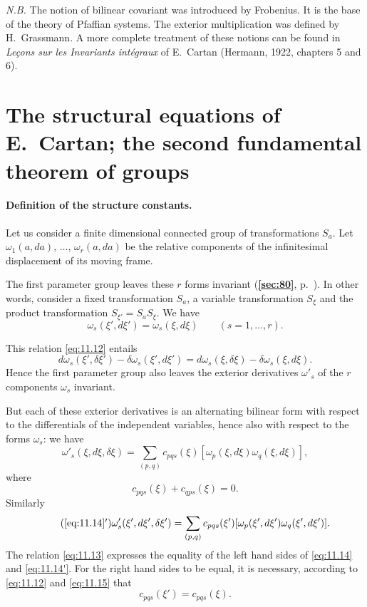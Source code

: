 \documentclass[leqno,11pt]{book}
\numberwithin{equation}{chapter}
\theoremstyle{shape1}
\theoremstyle{shapesmall}
\newcommand{\fsref}[1]{{\rm\textsection\textbf{\ref{sec:#1}}}}
\begin{document}
\emph{N.B.} The notion of bilinear covariant was introduced by Frobenius. It is the base of the theory of Pfaffian systems. The exterior multiplication was defined by H.~Grassmann. A more complete treatment of these notions can be found in \emph{Leçons sur les Invariants intégraux} of E.~Cartan (Hermann, 1922, chapters 5 and 6).


\section{The structural equations of E.~Cartan; the second fundamental theorem of groups}
\label{sec:struct-equat-e}

\paragraph{Definition of the structure constants.}
\label{sec:157}
Let us consider a finite dimensional connected group of transformations $S_{a}$. Let $\omega_{1}(a,da)$, $\dots$, $\omega_{r}(a,da)$ be the relative components of the infinitesimal displacement of its moving frame.

The first parameter group leaves these $r$ forms invariant (\fsref{80}, p.~\pageref{sec:80}). In other words, consider a fixed transformation $S_{a}$, a variable transformation $S_{\xi}$ and the product transformation $S_{\xi'}=S_{a}S_{\xi}$. We have
\begin{equation}
  \label{eq:11.12}
  \omega_{s}(\xi',d\xi')=\omega_{s}(\xi,d\xi)\qquad(s=1,\dots,r).
\end{equation}

This relation \eqref{eq:11.12} entails
\begin{equation}
  \label{eq:11.13}
  d\omega_{s}(\xi',\delta\xi')-\delta\omega_{s}(\xi',d\xi')=d\omega_{s}(\xi,\delta\xi)-\delta\omega_{s}(\xi,d\xi).
\end{equation}
Hence the first parameter group also leaves the exterior derivatives $\omega'_{s}$ of the $r$ components $\omega_{s}$ invariant.

But each of these exterior derivatives is an alternating bilinear form with respect to the differentials of the independent variables, hence also with respect to the forms $\omega_{s}$: we have
\begin{equation}
  \label{eq:11.14}
  \omega'_{s}(\xi,d\xi,\delta\xi)=\sum_{(p,q)}c_{pqs}(\xi)[\omega_{p}(\xi,d\xi)\omega_{q}(\xi,d\xi)],
\end{equation}
where
\begin{equation}
  \label{eq:11.15}
  c_{pqs}(\xi)+c_{qps}(\xi)=0.
\end{equation}
Similarly
\begin{equation}
  \label{eq:11.14'}\tag{\ref{eq:11.14}$'$}
  \omega'_{s}(\xi',d\xi',\delta\xi')=\sum_{(p,q)}c_{pqs}(\xi')[\omega_{p}(\xi',d\xi')\omega_{q}(\xi',d\xi')].
\end{equation}
The relation \eqref{eq:11.13} expresses the equality of the left hand sides of \eqref{eq:11.14} and \eqref{eq:11.14'}. For the right hand sides to be equal, it is necessary, according to \eqref{eq:11.12} and \eqref{eq:11.15} that
\[
c_{pqs}(\xi')=c_{pqs}(\xi).
\]
\end{document}
